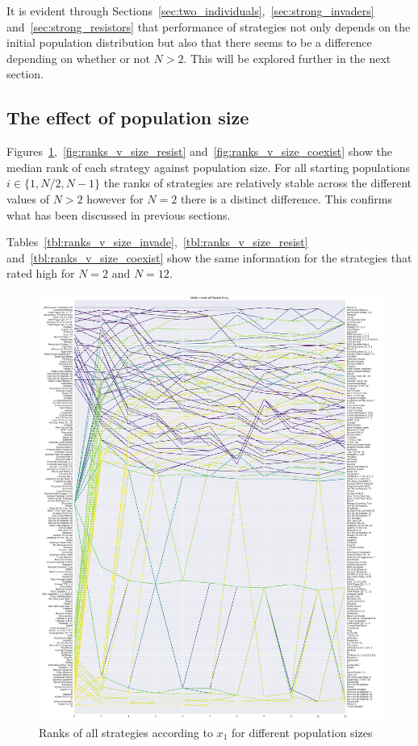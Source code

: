 \documentclass{article}
\begin{document}
It is evident through
Sections~\ref{sec:two_individuals},~\ref{sec:strong_invaders}
and~\ref{sec:strong_resistors} that performance of strategies not only depends
on the initial population distribution but also that there seems to be a
difference depending on whether or not \(N>2\). This will be explored further in
the next section.

\subsection{The effect of population size}\label{sec:population_size}

Figures~\ref{fig:ranks_v_size_invade},~\ref{fig:ranks_v_size_resist}
and~\ref{fig:ranks_v_size_coexist} show the median rank of each strategy against
population size. For all starting populations \(i\in\{1, N/2, N-1\}\) the ranks
of strategies are relatively stable across the different values of \(N>2\)
however for \(N=2\) there is a distinct difference. This confirms what has been
discussed in previous sections.

Tables~\ref{tbl:ranks_v_size_invade},~\ref{tbl:ranks_v_size_resist}
and~\ref{tbl:ranks_v_size_coexist} show the same information for the strategies
that rated high for \(N=2\) and \(N=12\).

\begin{figure}[!hbtp]
    \centering
    \includegraphics[height=.9\textheight]{./img/median_rank_vs_population_size_invade.pdf}
    \caption{Ranks of all strategies according to \(x_1\) for different
    population sizes}
    \label{fig:ranks_v_size_invade}
\end{figure}
\end{document}
